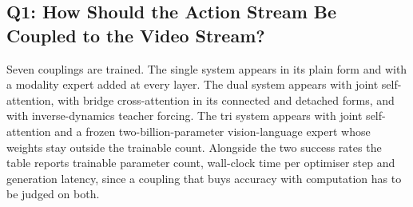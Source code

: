\begin{table}[t]
\centering
\small
\caption{The six questions of the study, the axis each one moves, and the number
of configurations trained for it. Every configuration inherits the reference
setting of  on every other axis, and every configuration
receives an identical optimisation budget.}
\label{tab:protocol}
\end{table}

\subsection{Q1: How Should the Action Stream Be Coupled to the Video Stream?}
\label{sec:q1}

Seven couplings are trained. The single system appears in its plain form and with
a modality expert added at every layer. The dual system appears with joint
self-attention, with bridge cross-attention in its connected and detached forms,
and with inverse-dynamics teacher forcing. The tri system appears with joint
self-attention and a frozen two-billion-parameter vision-language expert whose
weights stay outside the trainable count. Alongside the two success rates the
table reports trainable parameter count, wall-clock time per optimiser step and
generation latency, since a coupling that buys accuracy with computation has to
be judged on both.

